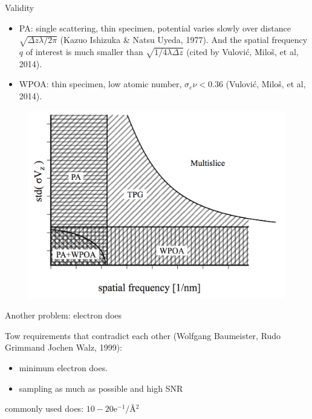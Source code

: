 \documentclass[slidestop,compress,12pt]{beamer}
\begin{document}
\begin{frame}{Validity}
    \begin{itemize}
    \item PA: single scattering, thin specimen, potential varies slowly over distance $\sqrt{\Delta z \lambda / 2\pi}$ (Kazuo Ishizuka \& Natsu Uyeda, 1977). And the spatial frequency $q$ of interest is much smaller than $\sqrt{1/4\lambda \Delta z}$ (cited by Vulović, Miloš, et al, 2014).
    \item WPOA: thin specimen, low atomic number, $\sigma_e \nu < 0.36$ (Vulović, Miloš, et al, 2014).
    \end{itemize}
    \vspace{-1cm}
    \begin{figure}
        \includegraphics[scale=0.3, right]{imgs/validity.png}
    \end{figure}
\end{frame}

\begin{frame}{Another problem: electron does}

Tow requirements that contradict each other (Wolfgang Baumeister, Rudo Grimmand Jochen Walz, 1999):
    \begin{itemize}
        \item minimum electron does.
        \item sampling as much as possible and high SNR
    \end{itemize}
\vspace{0.5cm}
    commonly used does: $10-20 \text{e}^{-1}/$\AA${}^2$
\end{frame}
\end{document}
